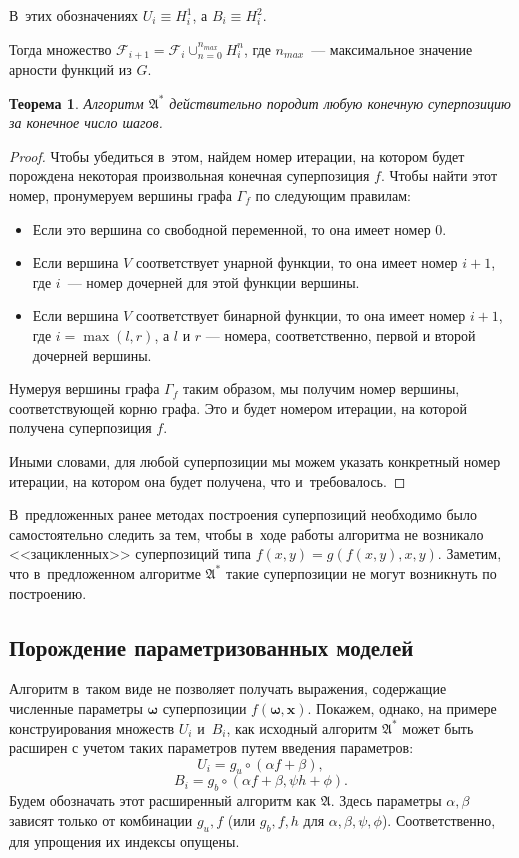 \documentclass[12pt,a4paper]{amsart}
\newtheorem{theorem}{Теорема}
\begin{document}
В~этих обозначениях $U_i \equiv H_i^1$, а $B_i \equiv H_i^2$.

Тогда множество $\mathcal{F}_{i+1} = \mathcal{F}_i \cup_{n=0}^{n_{max}} H_i^n$,
где $n_{max}$~--- максимальное значение арности функций из $G$.

\begin{theorem}
  Алгоритм $\mathfrak{A^*}$ действительно породит любую конечную суперпозицию
  за конечное число шагов.
\end{theorem}
\begin{proof}
  Чтобы убедиться в~этом, найдем номер итерации, на котором будет порождена
  некоторая произвольная конечная суперпозиция $f$. Чтобы найти этот номер,
  пронумеруем вершины графа $\Gamma_f$ по следующим правилам:
  \begin{itemize}
	\item Если это вершина со свободной переменной, то она имеет номер $0$.
	\item Если вершина $V$ соответствует унарной функции, то она имеет номер
	  $i+1$, где $i$~--- номер дочерней для этой функции вершины.
	\item Если вершина $V$ соответствует бинарной функции, то она имеет номер
	  $i+1$, где $i = \max (l, r)$, а $l$ и $r$ --- номера, соответственно,
	  первой и второй дочерней вершины.
  \end{itemize}

  Нумеруя вершины графа $\Gamma_f$ таким образом, мы получим номер вершины,
  соответствующей корню графа. Это и будет номером итерации, на которой получена
  суперпозиция $f$.
  
  Иными словами, для любой суперпозиции мы можем указать конкретный номер
  итерации, на котором она будет получена, что и~требовалось.
\end{proof}

В~предложенных ранее методах\cite{Zelinka2008} построения суперпозиций
необходимо было самостоятельно следить за тем, чтобы в~ходе работы алгоритма
не возникало <<зацикленных>> суперпозиций типа $f(x, y) = g (f(x, y), x, y)$.
Заметим, что в~предложенном алгоритме $\mathfrak{A^*}$ такие суперпозиции
не могут возникнуть по построению.

\subsection{Порождение параметризованных моделей}
Алгоритм в~таком виде не позволяет получать выражения, содержащие численные
параметры $\boldsymbol{\omega}$ суперпозиции $f(\boldsymbol{\omega}, \mathbf{x})$.
Покажем, однако, на примере конструирования множеств $U_i$ и~$B_i$, как
исходный алгоритм $\mathfrak{A^*}$ может быть расширен с учетом таких
параметров путем введения параметров:
\[
U_i = { g_u \circ (\alpha f + \beta) },
\]
\[
B_i = { g_b \circ (\alpha f + \beta, \psi h + \phi) }.
\]
Будем обозначать этот расширенный алгоритм как $\mathfrak{A}$. Здесь параметры
$\alpha, \beta$ зависят только от комбинации $g_u, f$ (или $g_b, f, h$ для
$\alpha, \beta, \psi, \phi$). Соответственно, для упрощения их индексы опущены.
\end{document}
